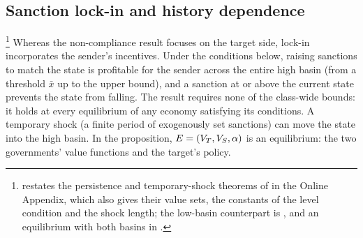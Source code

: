 \subsection{Sanction lock-in and history dependence}
\label{sec:results:lockin}

\footnote{ restates the persistence
and temporary-shock theorems of  in the Online Appendix,
which also gives their value sets, the constants of the level condition and the
shock length; the low-basin counterpart is
, and an equilibrium with both basins in
.} Whereas the non-compliance result focuses on the target
side, lock-in incorporates the sender's incentives. Under the conditions below,
raising sanctions to match the state is profitable for the sender across the entire high
basin (from a threshold $\bar x$ up to the upper bound), and a sanction at or above the
current state prevents the state from falling. The result requires none of the
class-wide bounds: it holds at every equilibrium of any economy satisfying its
conditions. A temporary shock (a finite period of exogenously set sanctions) can move
the state into the high basin. In the proposition, $E=(V_T,V_S,\alpha)$ is an equilibrium:
the two governments' value functions and the target's policy.

